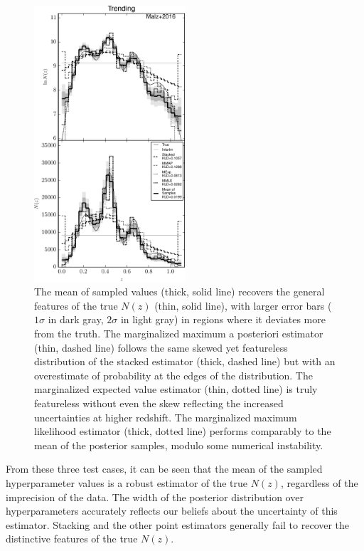 \begin{figure}
	\includegraphics[width=0.5\textwidth]{figures/chippr/vars_comps.pdf}
	\caption{The mean of sampled values (thick, solid line) recovers the general features of the true $N(z)$ (thin, solid line), with larger error bars ($1\sigma$ in dark gray, $2\sigma$ in light gray) in regions where it deviates more from the truth.  
		The marginalized maximum a posteriori estimator (thin, dashed line) follows the same skewed yet featureless distribution of the stacked estimator (thick, dashed line) but with an overestimate of probability at the edges of the distribution.  
		The marginalized expected value estimator (thin, dotted line) is truly featureless without even the skew reflecting the increased uncertainties at higher redshift.  
		The marginalized maximum likelihood estimator (thick, dotted line) performs comparably to the mean of the posterior samples, modulo some numerical instability.}
\end{figure}

From these three test cases, it can be seen that the mean of the sampled hyperparameter values is a robust estimator of the true $N(z)$, regardless of the imprecision of the data.  
The width of the posterior distribution over hyperparameters accurately reflects our beliefs about the uncertainty of this estimator.  
Stacking and the other point estimators generally fail to recover the distinctive features of the true $N(z)$.

